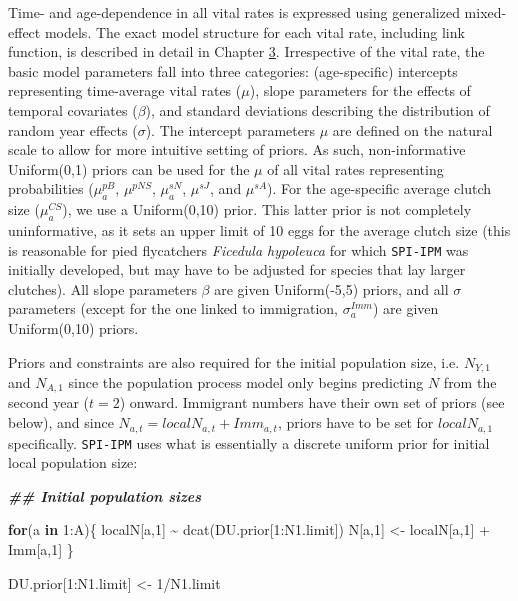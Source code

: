\documentclass[
]{book}
\newenvironment{Shaded}{\begin{snugshade}}{\end{snugshade}}
\newcommand{\ControlFlowTok}[1]{\textcolor[rgb]{0.13,0.29,0.53}{\textbf{#1}}}
\newcommand{\DecValTok}[1]{\textcolor[rgb]{0.00,0.00,0.81}{#1}}
\newcommand{\DocumentationTok}[1]{\textcolor[rgb]{0.56,0.35,0.01}{\textbf{\textit{#1}}}}
\newcommand{\FunctionTok}[1]{\textcolor[rgb]{0.00,0.00,0.00}{#1}}
\newcommand{\NormalTok}[1]{#1}
\newcommand{\OtherTok}[1]{\textcolor[rgb]{0.56,0.35,0.01}{#1}}
\newcommand{\SpecialCharTok}[1]{\textcolor[rgb]{0.00,0.00,0.00}{#1}}
\begin{document}
Time- and age-dependence in all vital rates is expressed using generalized
mixed-effect models. The exact model structure for each vital rate,
including link function, is described in detail in Chapter \protect\hyperlink{ux5cux2520Modellingux5cux2520temporalux5cux2520variation}{3}. Irrespective of the vital rate, the basic model parameters fall into
three categories: (age-specific) intercepts representing time-average vital
rates (\(\mu\)), slope parameters for the effects of temporal covariates (\(\beta\)),
and standard deviations describing the distribution of random year effects
(\(\sigma\)).
The intercept parameters \(\mu\) are defined on the natural scale to allow for
more intuitive setting of priors. As such, non-informative Uniform(0,1) priors
can be used for the \(\mu\) of all vital rates representing probabilities
(\(\mu_a^{pB}\), \(\mu^{pNS}\), \(\mu_a^{sN}\), \(\mu^{sJ}\), and \(\mu^{sA}\)). For the
age-specific average clutch size (\(\mu_a^{CS}\)), we use a Uniform(0,10) prior.
This latter prior is not completely uninformative, as it sets an upper limit of
10 eggs for the average clutch size (this is reasonable for pied flycatchers
\textit{Ficedula hypoleuca} for which \texttt{SPI-IPM} was initially developed, but
may have to be adjusted for species that lay larger clutches).
All slope parameters \(\beta\) are given Uniform(-5,5) priors, and all \(\sigma\)
parameters (except for the one linked to immigration, \(\sigma_a^{Imm}\)) are
given Uniform(0,10) priors.

Priors and constraints are also required for the initial population size, i.e.
\(N_{Y,1}\) and \(N_{A,1}\) since the population process model only begins
predicting \(N\) from the second year (\(t=2\)) onward. Immigrant numbers have their
own set of priors (see below), and since \(N_{a,t} = localN_{a,t} + Imm_{a,t}\),
priors have to be set for \(localN_{a,1}\) specifically. \texttt{SPI-IPM} uses what is
essentially a discrete uniform prior for initial local population size:

\begin{Shaded}
\begin{Highlighting}[]
\DocumentationTok{\#\# Initial population sizes}

\ControlFlowTok{for}\NormalTok{(a }\ControlFlowTok{in} \DecValTok{1}\SpecialCharTok{:}\NormalTok{A)\{}
\NormalTok{  localN[a,}\DecValTok{1}\NormalTok{] }\SpecialCharTok{\textasciitilde{}} \FunctionTok{dcat}\NormalTok{(DU.prior[}\DecValTok{1}\SpecialCharTok{:}\NormalTok{N1.limit])}
\NormalTok{  N[a,}\DecValTok{1}\NormalTok{] }\OtherTok{\textless{}{-}}\NormalTok{ localN[a,}\DecValTok{1}\NormalTok{] }\SpecialCharTok{+}\NormalTok{ Imm[a,}\DecValTok{1}\NormalTok{]}
\NormalTok{\}}

\NormalTok{DU.prior[}\DecValTok{1}\SpecialCharTok{:}\NormalTok{N1.limit] }\OtherTok{\textless{}{-}} \DecValTok{1}\SpecialCharTok{/}\NormalTok{N1.limit}
\end{Highlighting}
\end{Shaded}
\end{document}
